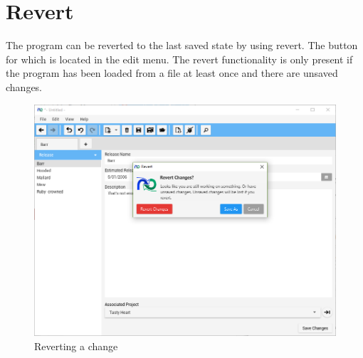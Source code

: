 \section{Revert}

The program can be reverted to the last saved state by using revert. The button for which is located in the edit menu.
The revert functionality is only present if the program has been loaded from a file at least once and there are unsaved changes.
\newline\newline


\begin{figure}[H]
\centering
\includegraphics[width=\textwidth]{images/screenshots/revert1.PNG}
\caption{Reverting a change}
\label{fig:revert}
\end{figure}
